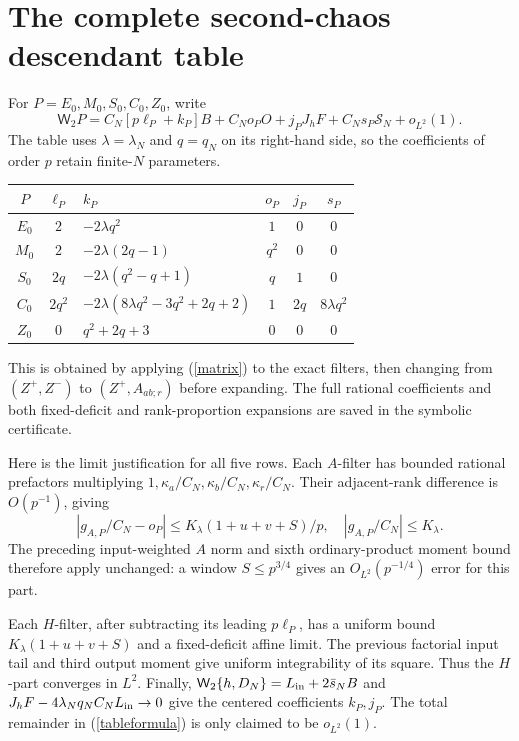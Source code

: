 \documentclass[11pt,a4paper]{article}
\newcommand{\W}[1]{\mathsf W_{#1}}
\begin{document}
\newpage
\section{The complete second-chaos descendant table}
For $P=E_0,M_0,S_0,C_0,Z_0$, write
\begin{equation}
 \W2P=C_N[p\ell_P+k_P]B+C_No_PO+j_PJ_hF
                         +C_Ns_P\mathcal S_N+o_{L^2}(1).\label{tableformula}
\end{equation}
The table uses $\lambda=\lambda_N$ and $q=q_N$ on its right-hand
side, so the coefficients of order $p$ retain finite-$N$ parameters.
\begin{center}\small
\begin{tabular}{cclccc}\toprule
 $P$&$\ell_P$&$k_P$&$o_P$&$j_P$&$s_P$\\\midrule
 $E_0$&$2$&$-2\lambda q^2$&$1$&$0$&$0$\\
 $M_0$&$2$&$-2\lambda(2q-1)$&$q^2$&$0$&$0$\\
 $S_0$&$2q$&$-2\lambda(q^2-q+1)$&$q$&$1$&$0$\\
 $C_0$&$2q^2$&$-2\lambda(8\lambda q^2-3q^2+2q+2)$&$1$&$2q$&$8\lambda q^2$\\
 $Z_0$&$0$&$q^2+2q+3$&$0$&$0$&$0$\\\bottomrule
\end{tabular}
\end{center}
This is obtained by applying (\ref{matrix}) to the exact filters,
then changing from $(Z^+,Z^-)$ to $(Z^+,A_{ab;r})$ before expanding.
The full rational coefficients and both fixed-deficit and
rank-proportion expansions are saved in the symbolic certificate.

Here is the limit justification for all five rows. Each $A$-filter
has bounded rational prefactors multiplying
$1,\kappa_a/C_N,\kappa_b/C_N,\kappa_r/C_N$.
Their adjacent-rank difference is $O(p^{-1})$, giving
\begin{equation}
 |g_{A,P}/C_N-o_P|\leq K_\lambda(1+u+v+S)/p,
 \quad |g_{A,P}/C_N|\leq K_\lambda.
\end{equation}
The preceding input-weighted $A$ norm and sixth ordinary-product
moment bound therefore apply unchanged: a window $S\leq p^{3/4}$
gives an $O_{L^2}(p^{-1/4})$ error for this part.

Each $H$-filter, after subtracting its leading $p\ell_P$, has a
uniform bound $K_\lambda(1+u+v+S)$ and a fixed-deficit affine limit.
The previous factorial input tail and third output moment give
uniform integrability of its square. Thus the $H$-part converges
in $L^2$. Finally,
$\W2\{h,D_N\}=L_{\rm in}+2\bar s_NB$ and
$J_hF-4\lambda_Nq_NC_NL_{\rm in}\to0$ give the centered coefficients
$k_P,j_P$. The total remainder in (\ref{tableformula}) is only
claimed to be $o_{L^2}(1)$.
\end{document}
